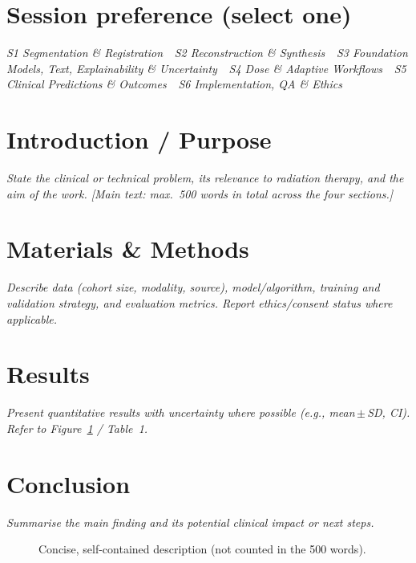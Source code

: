 \documentclass[10pt,a4paper]{article}
\begin{document}
\section{Session preference (select one)}
{\small\itshape\color{aiGrey}
S1 Segmentation \& Registration \,\textperiodcentered\,
S2 Reconstruction \& Synthesis \,\textperiodcentered\,
S3 Foundation Models, Text, Explainability \& Uncertainty \,\textperiodcentered\,
S4 Dose \& Adaptive Workflows \,\textperiodcentered\,
S5 Clinical Predictions \& Outcomes \,\textperiodcentered\,
S6 Implementation, QA \& Ethics}

\section{Introduction / Purpose}
\textit{State the clinical or technical problem, its relevance to radiation
therapy, and the aim of the work. [Main text: max.\ 500 words in total across
the four sections.]}

\section{Materials \& Methods}
\textit{Describe data (cohort size, modality, source), model/algorithm,
training and validation strategy, and evaluation metrics. Report
ethics/consent status where applicable.}

\section{Results}
\textit{Present quantitative results with uncertainty where possible (e.g.,
mean\,$\pm$\,SD, CI). Refer to Figure~\ref{fig:example} / Table~1.}

\section{Conclusion}
\textit{Summarise the main finding and its potential clinical impact or next
steps.}

\begin{figure}[h]
  \centering
  \caption{Concise, self-contained description (not counted in the 500 words).}
  \label{fig:example}
\end{figure}
\end{document}
